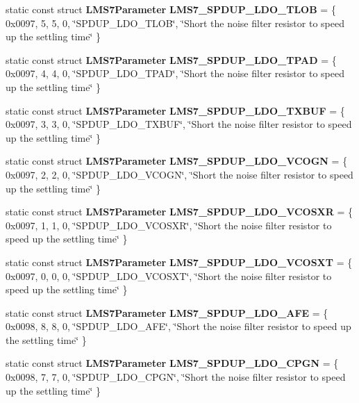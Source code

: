 \begin{DoxyCompactItemize}
\item 
static const struct {\bf L\+M\+S7\+Parameter} {\bf L\+M\+S7\+\_\+\+S\+P\+D\+U\+P\+\_\+\+L\+D\+O\+\_\+\+T\+L\+OB} = \{ 0x0097, 5, 5, 0, \char`\"{}\+S\+P\+D\+U\+P\+\_\+\+L\+D\+O\+\_\+\+T\+L\+O\+B\char`\"{}, \char`\"{}\+Short the noise filter resistor to speed up the settling time\char`\"{} \}
\item 
static const struct {\bf L\+M\+S7\+Parameter} {\bf L\+M\+S7\+\_\+\+S\+P\+D\+U\+P\+\_\+\+L\+D\+O\+\_\+\+T\+P\+AD} = \{ 0x0097, 4, 4, 0, \char`\"{}\+S\+P\+D\+U\+P\+\_\+\+L\+D\+O\+\_\+\+T\+P\+A\+D\char`\"{}, \char`\"{}\+Short the noise filter resistor to speed up the settling time\char`\"{} \}
\item 
static const struct {\bf L\+M\+S7\+Parameter} {\bf L\+M\+S7\+\_\+\+S\+P\+D\+U\+P\+\_\+\+L\+D\+O\+\_\+\+T\+X\+B\+UF} = \{ 0x0097, 3, 3, 0, \char`\"{}\+S\+P\+D\+U\+P\+\_\+\+L\+D\+O\+\_\+\+T\+X\+B\+U\+F\char`\"{}, \char`\"{}\+Short the noise filter resistor to speed up the settling time\char`\"{} \}
\item 
static const struct {\bf L\+M\+S7\+Parameter} {\bf L\+M\+S7\+\_\+\+S\+P\+D\+U\+P\+\_\+\+L\+D\+O\+\_\+\+V\+C\+O\+GN} = \{ 0x0097, 2, 2, 0, \char`\"{}\+S\+P\+D\+U\+P\+\_\+\+L\+D\+O\+\_\+\+V\+C\+O\+G\+N\char`\"{}, \char`\"{}\+Short the noise filter resistor to speed up the settling time\char`\"{} \}
\item 
static const struct {\bf L\+M\+S7\+Parameter} {\bf L\+M\+S7\+\_\+\+S\+P\+D\+U\+P\+\_\+\+L\+D\+O\+\_\+\+V\+C\+O\+S\+XR} = \{ 0x0097, 1, 1, 0, \char`\"{}\+S\+P\+D\+U\+P\+\_\+\+L\+D\+O\+\_\+\+V\+C\+O\+S\+X\+R\char`\"{}, \char`\"{}\+Short the noise filter resistor to speed up the settling time\char`\"{} \}
\item 
static const struct {\bf L\+M\+S7\+Parameter} {\bf L\+M\+S7\+\_\+\+S\+P\+D\+U\+P\+\_\+\+L\+D\+O\+\_\+\+V\+C\+O\+S\+XT} = \{ 0x0097, 0, 0, 0, \char`\"{}\+S\+P\+D\+U\+P\+\_\+\+L\+D\+O\+\_\+\+V\+C\+O\+S\+X\+T\char`\"{}, \char`\"{}\+Short the noise filter resistor to speed up the settling time\char`\"{} \}
\item 
static const struct {\bf L\+M\+S7\+Parameter} {\bf L\+M\+S7\+\_\+\+S\+P\+D\+U\+P\+\_\+\+L\+D\+O\+\_\+\+A\+FE} = \{ 0x0098, 8, 8, 0, \char`\"{}\+S\+P\+D\+U\+P\+\_\+\+L\+D\+O\+\_\+\+A\+F\+E\char`\"{}, \char`\"{}\+Short the noise filter resistor to speed up the settling time\char`\"{} \}
\item 
static const struct {\bf L\+M\+S7\+Parameter} {\bf L\+M\+S7\+\_\+\+S\+P\+D\+U\+P\+\_\+\+L\+D\+O\+\_\+\+C\+P\+GN} = \{ 0x0098, 7, 7, 0, \char`\"{}\+S\+P\+D\+U\+P\+\_\+\+L\+D\+O\+\_\+\+C\+P\+G\+N\char`\"{}, \char`\"{}\+Short the noise filter resistor to speed up the settling time\char`\"{} \}

\end{DoxyCompactItemize}
